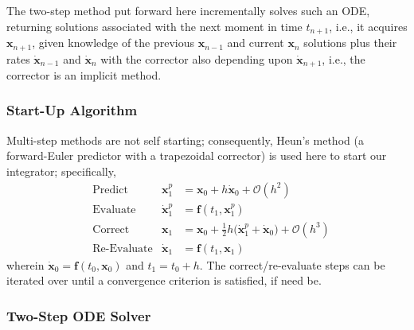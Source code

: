 The two-step method put forward here incrementally solves such an ODE, returning solutions associated with the next moment in time $t_{n+1}$, i.e., it acquires $\mathbf{x}_{n+1}$, given knowledge of the  previous $\mathbf{x}_{n-1}$ and current $\mathbf{x}_n$ solutions plus their rates $\dot{\mathbf{x}}_{n-1}$ and $\dot{\mathbf{x}}_n$ with the corrector also depending upon $\dot{\mathbf{x}}_{n+1}$, i.e., the corrector is an implicit method.

\subsubsection{Start-Up Algorithm}

Multi-step methods are not self starting; consequently, Heun's method (a forward-Euler predictor with a trapezoidal corrector) is used here to start our integrator; specifically,
\begin{subequations}
    \label{startUp1stOrderODEs}
    \begin{align}
    \mbox{} & \text{Predict} & 
    \mathbf{x}_1^p & = \mathbf{x}_0 + h \dot{\mathbf{x}}_0 + \mathcal{O} (h^2)
    \label{startUp1stOrderPredictor} \\
    \mbox{} & \text{Evaluate} & 
    \dot{\mathbf{x}}^p_1 & = \mathbf{f} (t_1 , \mathbf{x}_1^p) 
    \label{startUp1stEvaluate} \\
    \mbox{} & \text{Correct} &
    \mathbf{x}_1 & = \mathbf{x}_0 + \tfrac{1}{2} h 
    \bigl( \dot{\mathbf{x}}_1^p + \dot{\mathbf{x}}_0 \bigr) + \mathcal{O} (h^3)
    \label{startUp1stOrderCorrector} \\
    \mbox{} & \text{Re-Evaluate} & 
    \dot{\mathbf{x}}_1 & = \mathbf{f} (t_1 , \mathbf{x}_1) 
    \label{startUp1stReEvaluate}
    \end{align}
\end{subequations}
wherein $\dot{\mathbf{x}}_0 = \mathbf{f}(t_0, \mathbf{x}_0)$ and $t_1 = t_0 + h$.  The correct\slash re-evaluate steps can be iterated over until a convergence criterion is satisfied, if need be.

\subsubsection{Two-Step ODE Solver}

